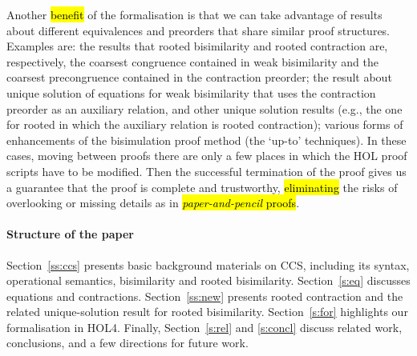 Another \hl{benefit} of the formalisation is 
that we can take advantage of results about different 
equivalences and preorders that share similar proof structures. 
Examples are: the results that rooted bisimilarity and rooted contraction are,
respectively, the coarsest congruence contained in weak bisimilarity 
and the coarsest precongruence contained in the contraction preorder; 
the result about unique solution of equations for weak bisimilarity that uses the
contraction preorder as an auxiliary relation, and other unique solution results (e.g., 
the one for rooted in which
the auxiliary relation is rooted contraction); various forms of enhancements of the bisimulation
proof method (the `up-to' techniques).
In these cases, moving between proofs there are only a few places in
which the HOL proof scripts have to be modified.
Then the successful termination of the proof gives us a guarantee that the proof is
complete and trustworthy, \hl{eliminating} the risks 
of overlooking or missing details as in \hl{\emph{paper-and-pencil} proofs}.

\paragraph{Structure of the paper} 

Section~\ref{ss:ccs} presents basic background materials on CCS,
including its syntax, operational semantics, bisimilarity and rooted
bisimilarity.
%
Section~\ref{s:eq} discusses equations and contractions.
%
Section~\ref{ss:new} presents rooted contraction and the related
unique-solution result for rooted bisimilarity.
%
Section~\ref{s:for} highlights our formalisation in HOL4.
%
Finally,  Section~\ref{s:rel} and \ref{s:concl} discuss related work,
conclusions, and a few directions for future work.


